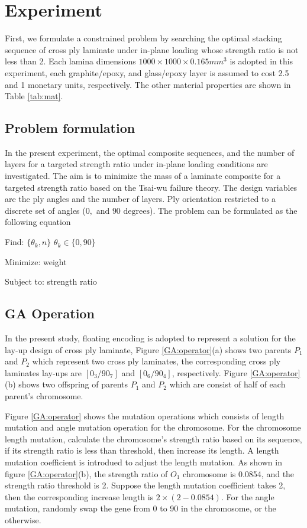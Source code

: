 \section{Experiment}
First, we formulate a constrained problem by searching the optimal stacking
sequence of cross ply laminate under in-plane loading whose strength ratio is
not less than 2.  Each lamina dimensions $1000 \times 1000 \times 0.165 mm^3$
is adopted in this experiment, each graphite/epoxy,  and glass/epoxy layer is
assumed to cost 2.5 and 1 monetary units, respectively. The other material
properties are shown in Table \ref{tab:mat}. 


\subsection{Problem formulation}

In the present experiment, the optimal composite sequences, and the number of
layers for a targeted strength ratio under in-plane loading conditions are
investigated.  The aim is to minimize the mass of a laminate composite for a
targeted strength ratio based on the Tsai-wu failure theory. The design
variables are the ply angles and the number of layers.  Ply orientation
restricted to a discrete set of angles ($0, \text{ and } 90 \text{ degrees} $).
The problem can be formulated as the following equation

Find: $\{\theta_k, n\}$ $\theta_k \in \{ 0,90\}$

Minimize: weight

Subject to: strength ratio


\subsection{GA Operation}


In the present study, floating encoding is adopted to represent a solution for
the lay-up design of cross ply laminate, Figure \ref{GA:operator}(a) shows two
parents $P_1$ and $P_2$ which represent two cross ply laminates, the
corresponding cross ply laminates lay-ups are $[0_3/90_7]$ and $[0_6/90_4]$,
respectively. Figure \ref{GA:operator}(b) shows two offspring of parents $P_1$
and $P_2$ which are consist of half of each parent's chromosome.

Figure \ref{GA:operator} shows the mutation operations which consists of
length mutation and angle mutation operation for the chromosome. For the chromosome length
mutation, calculate the chromosome's strength ratio based on its sequence, if
its strength ratio is less than threshold, then increase its length. A length
mutation coefficient  is introdued to adjust the length mutation.  As
shown in figure \ref{GA:operator}(b), the strength ratio of $O_1$ chromosome is
0.0854, and the strength ratio threshold is 2. Suppose the length mutation
coefficient takes 2, then the corresponding increase length is $2
\times(2-0.0854)$. For the angle mutation, randomly swap the gene from
0 to 90 in the chromosome, or the otherwise.



